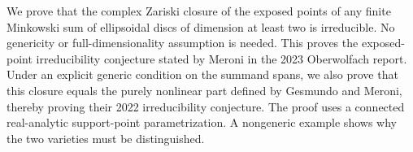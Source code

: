 
We prove that the complex Zariski closure of the exposed points of any
finite Minkowski sum of ellipsoidal discs of dimension at least two is
irreducible. No genericity or full-dimensionality assumption is needed.
This proves the exposed-point irreducibility conjecture stated by Meroni
in the 2023 Oberwolfach report. Under an explicit generic condition on
the summand spans, we also prove that this closure equals the purely
nonlinear part defined by Gesmundo and Meroni, thereby proving their
2022 irreducibility conjecture. The proof uses a connected real-analytic
support-point parametrization. A nongeneric example shows why the two
varieties must be distinguished.
